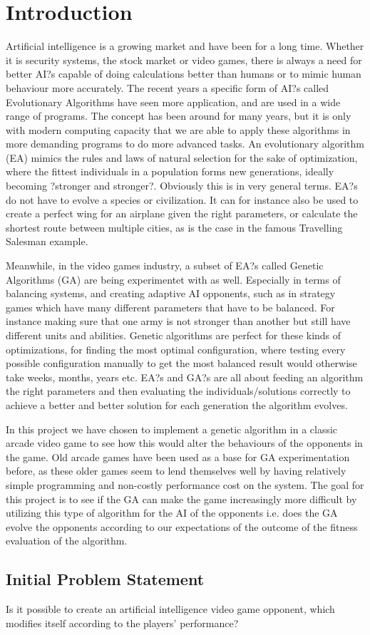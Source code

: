 \section{Introduction} \label{sec:introduction}
Artificial intelligence is a growing market and have been for a long time. Whether it is security systems, the stock market or video games, there is always a need for better AI?s capable of doing calculations better than humans or to mimic human behaviour more accurately. The recent years a specific form of AI?s called Evolutionary Algorithms have seen more application, and are used in a wide range of programs. The concept has been around for many years, but it is only with modern computing capacity that we are able to apply these algorithms in more demanding programs to do more advanced tasks. An evolutionary algorithm (EA) mimics the rules and laws of natural selection for the sake of optimization, where the fittest individuals in a population forms new generations, ideally becoming ?stronger and stronger?. Obviously this is in very general terms. EA?s do not have to evolve a species or civilization. It can for instance also be used to create a perfect wing for an airplane given the right parameters, or calculate the shortest route between multiple cities, as is the case in the famous Travelling Salesman example. 

Meanwhile, in the video games industry, a subset of EA?s called Genetic Algorithms (GA) are being experimentet with as well. Especially in terms of balancing systems, and creating adaptive AI opponents, such as in strategy games which have many different parameters that have to be balanced. For instance making sure that one army is not stronger than another but still have different units and abilities. Genetic algorithms are perfect for these kinds of optimizations, for finding the most optimal configuration, where testing every possible configuration manually to get the most balanced result would otherwise take weeks, months, years etc. EA?s and GA?s are all about feeding an algorithm the right parameters and then evaluating the individuals/solutions correctly to achieve a better and better solution for each generation the algorithm evolves. 

In this project we have chosen to implement a genetic algorithm in a classic arcade video game to see how this would alter the behaviours of the opponents in the game. Old arcade games have been used as a base for GA experimentation before, as these older games seem to lend themselves well by having relatively simple programming and non-costly performance cost on the system. The goal for this project is to see if the GA can make the game increasingly more difficult by utilizing this type of algorithm for the AI of the opponents i.e. does the GA evolve the opponents according to our expectations of the outcome of the fitness evaluation of the algorithm.



\subsection{Initial Problem Statement} \label{sec:initialproblemstatement}
Is it possible to create an artificial intelligence video game opponent, which modifies itself according to the players' performance?
